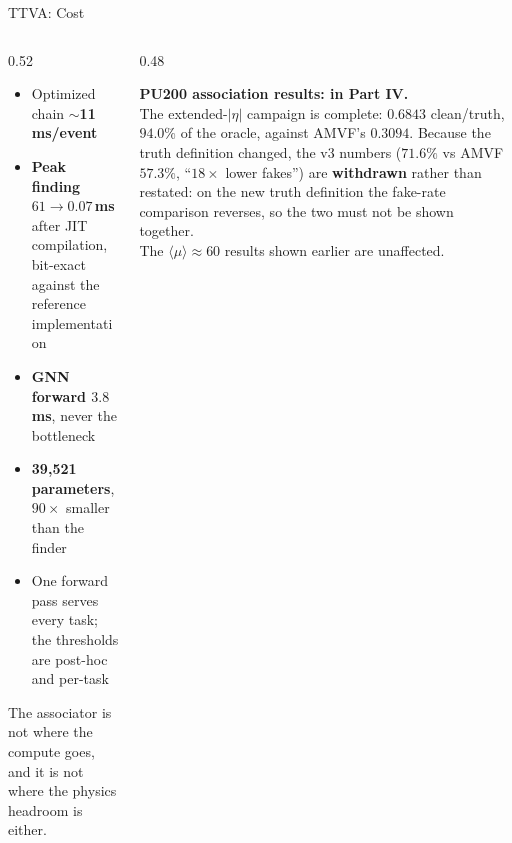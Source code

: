 \documentclass[xcolor=table,aspectratio=169]{beamer}
\begin{document}
\begin{frame}{TTVA: Cost}
    \begin{columns}[c]
        \begin{column}{0.52\linewidth}
            \small
            \begin{itemize}
                \setlength\itemsep{0.45em}
                \item Optimized chain \(\sim\)\textbf{11\,ms/event}
                \item \textbf{Peak finding $61 \to 0.07$\,ms} after JIT compilation,
                    bit-exact against the reference implementation
                \item \textbf{GNN forward $3.8$\,ms}, never the bottleneck
                \item \textbf{39{,}521 parameters}, $90\times$ smaller than the finder
                \item One forward pass serves every task; the thresholds are post-hoc
                    and per-task
            \end{itemize}
            \vspace{0.4em}
            {\footnotesize\textcolor{black!55}{The associator is not where the compute
            goes, and it is not where the physics headroom is either.}}
        \end{column}
        \begin{column}{0.48\linewidth}
            \centering
            \setlength{\fboxsep}{7pt}
            \colorbox{pennred!8}{\parbox{0.93\linewidth}{\small
            \textcolor{pennred}{\textbf{PU200 association results: in Part IV.}}\\[0.4em]
            The extended-$|\eta|$ campaign is complete: $0.6843$ clean/truth,
            $94.0\%$ of the oracle, against AMVF's $0.3094$.
            Because the truth definition changed, the v3 numbers
            ($71.6\%$ vs AMVF $57.3\%$, ``$18\times$ lower fakes'') are
            \textbf{withdrawn} rather than restated: on the new truth definition the
            fake-rate comparison reverses, so the two must not be shown
            together.\\[0.4em]
            The $\langle\mu\rangle\!\approx\!60$ results shown earlier are unaffected.}}
        \end{column}
    \end{columns}
\end{frame}

\end{document}
